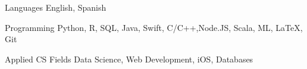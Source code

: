 

\begin{cvskills}

\cvskill
  {Languages} %
  {English, Spanish} %

  \cvskill
    {Programming} %
    {Python, R, SQL, Java, Swift, C/C++,Node.JS, Scala, ML, LaTeX, Git} %

  \cvskill
    {Applied CS Fields} %
    {Data Science, Web Development, iOS, Databases} %

\end{cvskills}
